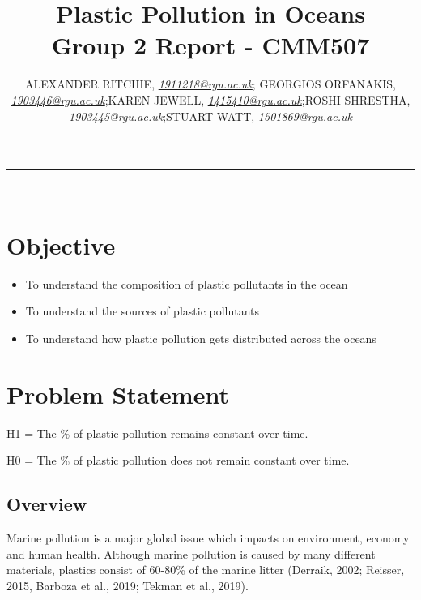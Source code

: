 \documentclass[10pt]{article}
\begin{document}
\title{\LARGE Plastic Pollution in Oceans  \\ Group 2 Report - CMM507}

\author{ALEXANDER RITCHIE, \textit{\href{1911218@rgu.ac.uk}{1911218@rgu.ac.uk}}; GEORGIOS ORFANAKIS, \textit{\href{1903446@rgu.ac.uk}{1903446@rgu.ac.uk}};KAREN JEWELL, \textit{\href{1415410@rgu.ac.uk}{1415410@rgu.ac.uk}};ROSHI SHRESTHA, \textit{\href{1903445@rgu.ac.uk}{1903445@rgu.ac.uk}};STUART WATT, \textit{\href{1501869@rgu.ac.uk}{1501869@rgu.ac.uk}}}

\maketitle
\noindent\rule{16cm}{0.4pt}
\ \\

\section*{Objective}


\begin{itemize}
\item To understand the composition of plastic pollutants in the ocean
\item To understand the sources of plastic pollutants
\item To understand how plastic pollution gets distributed across the oceans
\end{itemize}

\section{Problem Statement}\label{statement}

H1 = The \% of plastic pollution remains constant over time.

H0 = The \% of plastic pollution does not remain constant over time.


\subsection{Overview}\label{over}

Marine pollution is a major global issue which impacts on environment, economy and human health. Although marine pollution is caused by many different materials, plastics consist of 60-80\% of the marine litter (Derraik, 2002; Reisser, 2015, Barboza et al., 2019; Tekman et al., 2019). 
\end{document}
